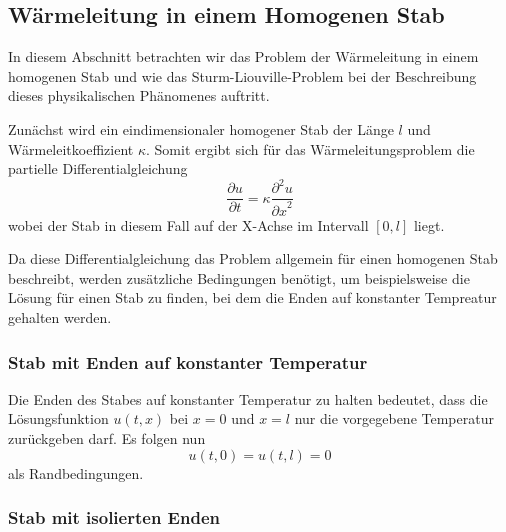 %
%
%

\subsection{Wärmeleitung in einem Homogenen Stab}

In diesem Abschnitt betrachten wir das Problem der Wärmeleitung in einem
homogenen Stab und wie das Sturm-Liouville-Problem bei der Beschreibung dieses
physikalischen Phänomenes auftritt.

Zunächst wird ein eindimensionaler homogener Stab der Länge $l$ und
Wärmeleitkoeffizient $\kappa$.
Somit ergibt sich für das Wärmeleitungsproblem
die partielle Differentialgleichung
\begin{equation}
    \label{eq:slp-example-fourier-heat-equation}
    \frac{\partial u}{\partial t} =
    \kappa \frac{\partial^{2}u}{{\partial x}^{2}}
\end{equation}
wobei der Stab in diesem Fall auf der X-Achse im Intervall $[0,l]$ liegt.

Da diese Differentialgleichung das Problem allgemein für einen homogenen
Stab beschreibt, werden zusätzliche Bedingungen benötigt, um beispielsweise
die Lösung für einen Stab zu finden, bei dem die Enden auf konstanter 
Tempreatur gehalten werden.


\subsubsection{Stab mit Enden auf konstanter Temperatur}

Die Enden des Stabes auf konstanter Temperatur zu halten bedeutet, dass die
Lösungsfunktion $u(t,x)$ bei $x = 0$ und $x = l$ nur die vorgegebene
Temperatur zurückgeben darf.
Es folgen nun
\begin{equation}
    \label{eq:slp-example-fourier-boundary-condition-ends-constant}
    u(t,0)
    =
    u(t,l)
    =
    0
\end{equation}
als Randbedingungen.


\subsubsection{Stab mit isolierten Enden}

